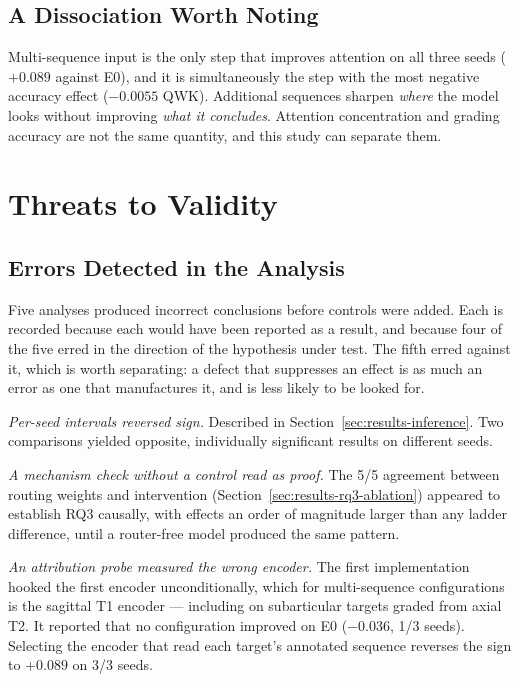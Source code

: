 \documentclass[12pt,a4paper]{report}
\begin{document}
\subsection{A Dissociation Worth Noting}

Multi-sequence input is the only step that improves attention on all three seeds
($+0.089$ against E0), and it is simultaneously the step with the most negative
accuracy effect ($-0.0055$ QWK). Additional sequences sharpen \emph{where} the
model looks without improving \emph{what it concludes}. Attention concentration
and grading accuracy are not the same quantity, and this study can separate them.

\section{Threats to Validity}
\label{sec:results-threats}

\subsection{Errors Detected in the Analysis}

Five analyses produced incorrect conclusions before controls were added. Each is
recorded because each would have been reported as a result, and because four of
the five erred in the direction of the hypothesis under test. The fifth erred
against it, which is worth separating: a defect that suppresses an effect is as
much an error as one that manufactures it, and is less likely to be looked for.

\emph{Per-seed intervals reversed sign.} Described in
Section~\ref{sec:results-inference}. Two comparisons yielded opposite,
individually significant results on different seeds.

\emph{A mechanism check without a control read as proof.} The 5/5 agreement
between routing weights and intervention (Section~\ref{sec:results-rq3-ablation})
appeared to establish RQ3 causally, with effects an order of magnitude larger
than any ladder difference, until a router-free model produced the same pattern.

\emph{An attribution probe measured the wrong encoder.} The first
implementation hooked the first encoder unconditionally, which for multi-sequence
configurations is the sagittal T1 encoder --- including on subarticular targets
graded from axial T2. It reported that no configuration improved on E0
($-0.036$, 1/3 seeds). Selecting the encoder that read each target's annotated
sequence reverses the sign to $+0.089$ on 3/3 seeds.
\end{document}
